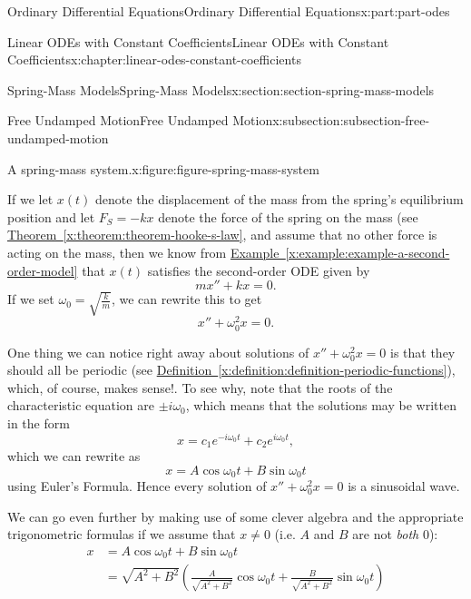 \documentclass[oneside,10pt,]{book}
\newcommand{\xreffont}{\relax}
\numberwithin{equation}{part}
\newcommand{\amp}{&}
\begin{document}
\begin{partptx}{Ordinary Differential Equations}{}{Ordinary Differential Equations}{}{}{x:part:part-odes}
\begin{chapterptx}{Linear ODEs with Constant Coefficients}{}{Linear ODEs with Constant Coefficients}{}{}{x:chapter:linear-odes-constant-coefficients}
\begin{sectionptx}{Spring-Mass Models}{}{Spring-Mass Models}{}{}{x:section:section-spring-mass-models}
\begin{subsectionptx}{Free Undamped Motion}{}{Free Undamped Motion}{}{}{x:subsection:subsection-free-undamped-motion}
\begin{figureptx}{A spring-mass system.}{x:figure:figure-spring-mass-system}{}
\begin{image}{0}{1}{0}
{
}%
\end{image}%
\tcblower
\end{figureptx}%
If we let \(x(t)\) denote the displacement of the mass from the spring's equilibrium position and let \(F_{S} = -kx\) denote the force of the spring on the mass (see \hyperref[x:theorem:theorem-hooke-s-law]{Theorem~{\xreffont\ref{x:theorem:theorem-hooke-s-law}}}, and assume that no other force is acting on the mass, then we know from \hyperref[x:example:example-a-second-order-model]{Example~{\xreffont\ref{x:example:example-a-second-order-model}}} that \(x(t)\) satisfies the second-order ODE given by%
\begin{equation*}
mx'' + kx = 0.
\end{equation*}
If we set \(\omega_{0} = \sqrt{\frac{k}{m}}\), we can rewrite this to get%
\begin{equation*}
x'' + \omega_{0}^{2}x = 0.
\end{equation*}
%
\par
One thing we can notice right away about solutions of \(x''+\omega_{0}^{2}x = 0\) is that they should all be periodic (see \hyperref[x:definition:definition-periodic-functions]{Definition~{\xreffont\ref{x:definition:definition-periodic-functions}}}), which, of course, makes sense!. To see why, note that the roots of the characteristic equation are \(\pm i\omega_{0}\), which means that the solutions may be written in the form%
\begin{equation*}
x = c_{1}e^{-i\omega_{0}t} + c_{2}e^{i\omega_{0}t},
\end{equation*}
which we can rewrite as%
\begin{equation*}
x = A\cos\omega_{0}t + B\sin\omega_{0}t
\end{equation*}
using Euler's Formula. Hence every solution of \(x''+\omega_{0}^{2}x = 0\) is a sinusoidal wave.%
\par
We can go even further by making use of some clever algebra and the appropriate trigonometric formulas if we assume that \(x\neq0\) (i.e. \(A\) and \(B\) are not \emph{both} \(0\)):%
\begin{align*}
x \amp = A\cos\omega_{0}t + B\sin\omega_{0}t \\
\amp = \sqrt{A^{2}+B^{2}}\left(\frac{A}{\sqrt{A^{2}+B^{2}}}\cos\omega_{0}t + \frac{B}{\sqrt{A^{2} + B^{2}}}\sin\omega_{0}t\right) 

\end{align*}
\end{subsectionptx}
\end{sectionptx}
\end{chapterptx}
\end{partptx}
\end{document}
